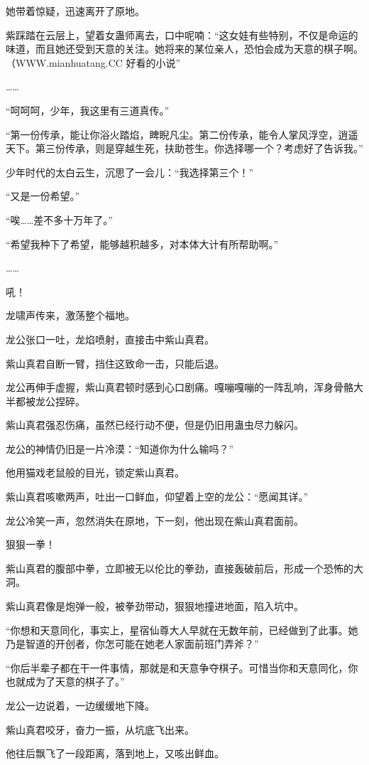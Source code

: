 \begin{this_body}
她带着惊疑，迅速离开了原地。

紫踩踏在云层上，望着女蛊师离去，口中呢喃：“这女娃有些特别，不仅是命运的味道，而且她还受到天意的关注。她将来的某位亲人，恐怕会成为天意的棋子啊。（WWW.mianhuatang.CC 好看的小说”

……

“呵呵呵，少年，我这里有三道真传。”

“第一份传承，能让你浴火踏焰，睥睨凡尘。第二份传承，能令人掌风浮空，逍遥天下。第三份传承，则是穿越生死，扶助苍生。你选择哪一个？考虑好了告诉我。”

少年时代的太白云生，沉思了一会儿：“我选择第三个！”

“又是一份希望。”

“唉……差不多十万年了。”

“希望我种下了希望，能够越积越多，对本体大计有所帮助啊。”

……

吼！

龙啸声传来，激荡整个福地。

龙公张口一吐，龙焰喷射，直接击中紫山真君。

紫山真君自断一臂，挡住这致命一击，只能后退。

龙公再伸手虚握，紫山真君顿时感到心口剧痛。嘎嘣嘎嘣的一阵乱响，浑身骨骼大半都被龙公捏碎。

紫山真君强忍伤痛，虽然已经行动不便，但是仍旧用蛊虫尽力躲闪。

龙公的神情仍旧是一片冷漠：“知道你为什么输吗？”

他用猫戏老鼠般的目光，锁定紫山真君。

紫山真君咳嗽两声，吐出一口鲜血，仰望着上空的龙公：“愿闻其详。”

龙公冷笑一声，忽然消失在原地，下一刻，他出现在紫山真君面前。

狠狠一拳！

紫山真君的腹部中拳，立即被无以伦比的拳劲，直接轰破前后，形成一个恐怖的大洞。

紫山真君像是炮弹一般，被拳劲带动，狠狠地撞进地面，陷入坑中。

“你想和天意同化，事实上，星宿仙尊大人早就在无数年前，已经做到了此事。她乃是智道的开创者，你怎可能在她老人家面前班门弄斧？”

“你后半辈子都在干一件事情，那就是和天意争夺棋子。可惜当你和天意同化，你也就成为了天意的棋子了。”

龙公一边说着，一边缓缓地下降。

紫山真君咬牙，奋力一振，从坑底飞出来。

他往后飘飞了一段距离，落到地上，又咳出鲜血。


\end{this_body}
